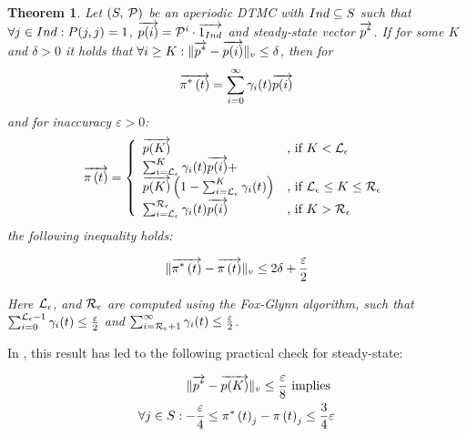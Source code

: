 \documentclass[times, 10pt,twocolumn]{article}
\newtheorem{theorem}{Theorem}
\begin{document}
		\begin{theorem}
			Let $\left( S,\: \mathcal{P} \right)$ be an aperiodic DTMC with $Ind \subseteq S$ such that $\forall j \in Ind : P(j,j) = 1$, $\overrightarrow{p(i)}=\mathcal{P}^{i} \cdot \overrightarrow{1_{Ind}}$ and steady-state vector $\overrightarrow{p^{*}}$. If for some $K$ and $\delta > 0$ it holds that $\forall i \geq K:\lVert \overrightarrow{p^{*}} - \overrightarrow{p(i)} \rVert_{v} \leq \delta$, then for
			{\small
			\[
				\overrightarrow{\pi^{*} \left( t \right)} = \sum_{i=0}^{\infty}\gamma_{i}(t) \overrightarrow{p(i)}
			\]
			}
			and for inaccuracy $\varepsilon > 0$:
			{\small
			\begin{equation}
				\displaystyle
				\overrightarrow{\pi \left( t \right) } = \left\{
				\begin{array}{ll}
					\overrightarrow{p(K)} & \text{, if } K < \mathcal{L}_{\epsilon}\\
					\sum_{i=\mathcal{L}_{\epsilon}}^{K}\gamma_{i}(t) \overrightarrow{p(i)} + & \\ \overrightarrow{p(K)} \left(1- \sum_{i=\mathcal{L}_{\epsilon}}^{K}\gamma_{i}(t) \right) & \text{, if } \mathcal{L}_{\epsilon} \leq K \leq \mathcal{R}_{\epsilon}\\
					\sum_{i=\mathcal{L}_{\epsilon}}^{\mathcal{R}_{\epsilon}}\gamma_{i}(t) \overrightarrow{p(i)} & \text{, if } K > \mathcal{R}_{\epsilon}\\
				\end{array}
				\right .
				\label{eq:ssd_LR_b}
			\end{equation}
			}
			the following inequality holds:
			{\small
			\begin{fframe}{0.5}{-0.3}
				\[
					\lVert  \overrightarrow{\pi^{*} \left( t \right)} - \overrightarrow{\pi \left( t \right) }  \rVert_{v} \leq 2 \delta + \frac{\varepsilon}{2}
				\]
			\end{fframe}
			}
			Here $\mathcal{L}_{\epsilon}$, and $\mathcal{R}_{\epsilon}$ are computed using the Fox-Glynn algorithm, such that $\sum_{i=0}^{\mathcal{L}_{\epsilon}{-}1} \gamma_{i}(t) \leq \frac{\varepsilon}{2}$ and $\sum_{i=\mathcal{R}_{\epsilon}{+}1}^{\infty} \gamma_{i}(t) \leq \frac{\varepsilon}{2}$.
			\label{th:error_bwd_initial}
		\end{theorem}
		In \cite{YounesKNP_STTT05}, this result has led to the following practical check for steady-state:
		{\small
			\begin{fframe}{0.78}{-0.3}
				\begin{eqnarray}
					\lVert \overrightarrow{p^{*}} - \overrightarrow{p(K)} \rVert_{v} \leq \frac{\varepsilon}{8} \text{ implies } \nonumber \\
					\forall j \in S : -\frac{\varepsilon}{4} \leq \pi^{*} \left( t \right)_{j} - \pi \left( t \right)_{j} \leq \frac{3}{4}\varepsilon \label{eq:youn_cr_cor}
				\end{eqnarray}
			\end{fframe}
		}
		
\end{document}

